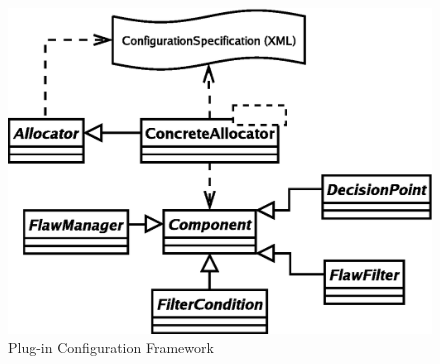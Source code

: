\documentclass[10pt, letterpaper, oneside]{article}
\begin{document}
\begin{figure}[t]
\includegraphics[scale=0.75]{ConfigurationFramework.eps}
\caption{Plug-in Configuration Framework}
\label{ConfigurationFramework}
\end{figure}
\end{document}
